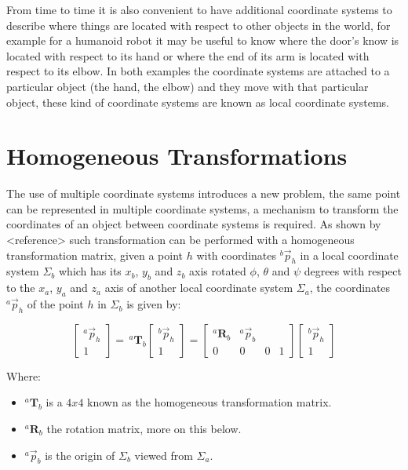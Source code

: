 \documentclass[a4paper]{report}
\begin{document}
From time to time it is also convenient to have additional coordinate systems to describe where things are located with respect to other objects in the world, for example for a humanoid robot it may be useful to know where the door's know is located with respect to its hand or where the end of its arm is located with respect to its elbow. In both examples the coordinate systems are attached to a particular object (the hand, the elbow) and they move with that particular object, these kind of coordinate systems are known as local coordinate systems.

\section{Homogeneous Transformations}
The use of multiple coordinate systems introduces a new problem, the same point can be represented in multiple coordinate systems, a mechanism to transform the coordinates of an object between coordinate systems is required. As shown by <reference> such transformation can be performed with a homogeneous transformation matrix, given a point $h$ with coordinates $^{b}\vec{p}_{h}$ in a local coordinate system $\Sigma_b$ which has its $x_b$, $y_b$ and $z_b$ axis rotated $\phi$, $\theta$ and $\psi$ degrees with respect to the $x_a$, $y_a$ and $z_a$ axis of another local coordinate system $\Sigma_{a}$, the coordinates $^{a}\vec{p}_{h}$ of the point $h$ in $\Sigma_b$ is given by:

\begin{equation}
    \begin{bmatrix} ^{a}\vec{p}_{h} \\ 1 \end{bmatrix} = \,
        ^{a}\boldsymbol{T}_{b}
        \begin{bmatrix}
            ^{b}\vec{p}_{h} \\ 1
        \end{bmatrix} =
        \begin{bmatrix}
            ^{a}\boldsymbol{R}_{b} & ^{a}\vec{p}_{b} \\
            0 & 0 & 0 & 1
        \end{bmatrix}
        \begin{bmatrix}
            ^{b}\vec{p}_{h} \\
            1
        \end{bmatrix}
\end{equation}

Where:
\begin{itemize}
    \item{} $^{a}\boldsymbol{T}_{b}$ is a $4x4$ known as the homogeneous transformation matrix.
    \item{} $^{a}\boldsymbol{R}_{b}$ the rotation matrix, more on this below.
    \item{} $^{a}\vec{p}_{b}$ is the origin of $\Sigma_{b}$ viewed from $\Sigma_{a}$.
\end{itemize}
\end{document}
